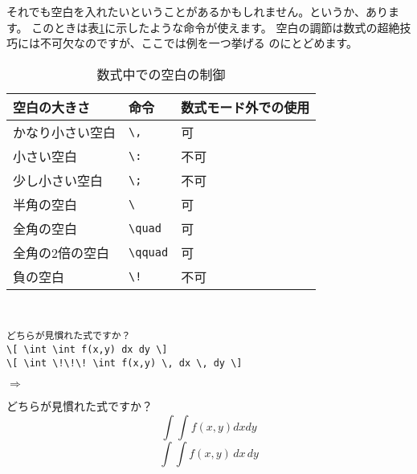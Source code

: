 それでも空白を入れたいということがあるかもしれません。というか、あります。
このときは表\ref{tab:space}に示したような命令が使えます。
空白の調節は数式の超絶技巧には不可欠なのですが、ここでは例を一つ挙げる
のにとどめます。
\begin{table}[htbp]
\begin{center}
\caption{数式中での空白の制御}
\label{tab:space}
\begin{tabular}{lll}
\hline
空白の大きさ     & 命令        & 数式モード外での使用 \\
\hline
かなり小さい空白 & \verb+\,+     & 可   \\
小さい空白       & \verb+\:+     & 不可 \\
少し小さい空白   & \verb+\;+     & 不可 \\
半角の空白       & \verb*+\ +  & 可   \\
全角の空白       & \verb+\quad+  & 可   \\
全角の2倍の空白  & \verb+\qquad+ & 可   \\
負の空白         & \verb+\!+     & 不可 \\
\hline
\end{tabular}
\end{center}
\end{table}
\\
\begin{minipage}[c]{.50\textwidth}
\begin{screen}
\small
\begin{verbatim}
どちらが見慣れた式ですか？
\[ \int \int f(x,y) dx dy \]
\[ \int \!\!\! \int f(x,y) \, dx \, dy \]
\end{verbatim}
\end{screen}
\end{minipage}%
$\Rightarrow$
\begin{minipage}{.45\textwidth}
\begin{shadebox}
どちらが見慣れた式ですか？
\[ \int \int f(x,y) dx dy \]
\[ \int \!\!\! \int f(x,y) \, dx \, dy \]
\end{shadebox}
\end{minipage}
\vspace*{1mm}\\

